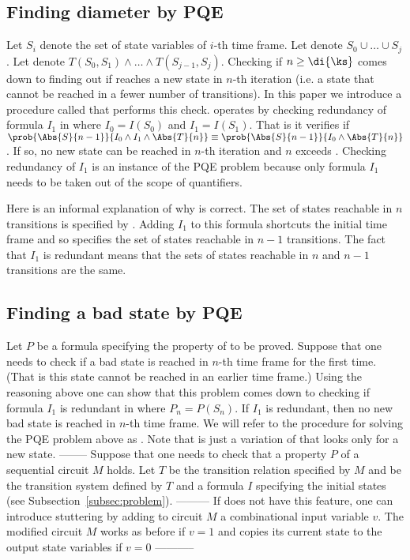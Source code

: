 \subsection{Finding diameter by PQE}
Let $S_i$ denote the set of state variables of $i$-th time frame.  Let
 denote $S_0 \cup \dots \cup S_j$. Let  denote
$T(S_0,S_1) \wedge \dots \wedge T(S_{j-1},S_j)$. Checking if $n \geq
\di{\ks}$ comes down to finding out if \KS reaches a new state in
$n$-th iteration (i.e. a state that cannot be reached in a fewer
number of transitions).  In this paper we introduce a procedure called
\CD that performs this check.  \CD operates by checking redundancy of
formula $I_1$ in 
where $I_0=I(S_0)$ and $I_1 = I(S_1)$. That is it verifies if
$\prob{\Abs{S}{n-1}}{I_0 \wedge I_1 \wedge \Abs{T}{n}} \equiv
\prob{\Abs{S}{n-1}}{I_0 \wedge \Abs{T}{n}}$. If so, no new state can
be reached in $n$-th iteration and $n$ exceeds \di{\ks}.  Checking
redundancy of $I_1$ is an instance of the PQE problem because only
formula $I_1$ needs to be taken out of the scope of quantifiers.

Here is an informal explanation of why \CD is correct.  The set of
states reachable in $n$ transitions is specified by
. Adding $I_1$ to this
formula shortcuts the initial time frame and so
 specifies the
set of states reachable in $n-1$ transitions. The fact that $I_1$ is
redundant means that the sets of states reachable in $n$ and $n-1$
transitions are the same.

\subsection{Finding a bad state by PQE}
Let $P$ be a formula specifying the property of \KS to be proved.
Suppose that one needs to check if a bad state is reached in $n$-th
time frame for the first time. (That is this state cannot be reached
in an earlier time frame.) Using the reasoning above one can show that
this problem comes down to checking if formula $I_1$ is redundant in
 where $P_n = P(S_n)$. If $I_1$ is redundant, then no
new bad state is reached in $n$-th time frame. We will refer to the
procedure for solving the PQE problem above as \bs. Note that \BS is
just a variation of \CD that looks only for a new  state.
--------
Suppose that one needs to check that a property $P$ of a sequential
circuit $M$ holds. Let $T$ be the transition relation specified by $M$
and \KS be the transition system defined by $T$ and a formula $I$
specifying the initial states (see Subsection~\ref{subsec:problem}).
---------
If \KS does not have this feature, one can
introduce stuttering by adding to circuit $M$ a combinational input
variable $v$.  The modified circuit $M$ works as before if $v=1$ and
copies its current state to the output state variables if $v=0$
-----------

